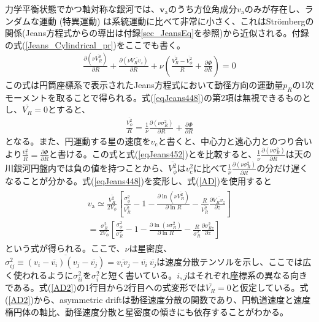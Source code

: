 力学平衡状態でかつ軸対称な銀河では、$\pmb{v}_{\mathrm{a}}$のうち方位角成分$v_{\mathrm{a}}$のみが存在し、ランダムな運動 (特異運動) は系統運動に比べて非常に小さく、これはStr\"{o}mbergの関係(Jeans方程式からの導出は付録\ref{sec_JeansEq}を参照)から近似される。付録の式(\ref{Jeans_Cylindrical_pr})をここでも書く。
\begin{align}
	\frac{\partial (\nu \overline{V_R^2})}{\partial R} + \frac{\partial (\nu \overline{V_R v_z})}{\partial R} + \nu\left(\frac{\overline{V_R^2} - \overline{V_{\phi}^2}}{R} + \frac{\partial \Phi}{\partial R} \right) = 0 \label{eqJeans448}
\end{align}
この式は円筒座標系で表示されたJeans方程式において動径方向の運動量$p_R$の1次モーメントを取ることで得られる。式(\ref{eqJeans448})の第2項は無視できるものとし、$\overline{V_R}=0$とすると、
\begin{align}
	\frac{\overline{V_{\phi}^2}}{R} = \frac{1}{\nu}\frac{\partial(\nu\sigma_R^2)}{\partial R} + \frac{\partial \Phi}{\partial R} \label{eqJeans452}
\end{align}
となる。また、円運動する星の速度を$v_{\mathrm{c}}$と書くと、中心力と遠心力とのつり合いより$\frac{v_{\mathrm{c}}^2}{R}=\frac{\partial \Phi}{\partial R}$と書ける。この式と式(\ref{eqJeans452})とを比較すると、$\frac{1}{\nu}\frac{\partial(\nu\sigma_R^2)}{\partial R}$は天の川銀河円盤内では負の値を持つことから、$\overline{V_{\phi}^2}$は$v_{\mathrm{c}}^2$に比べて$\frac{1}{\nu}\frac{\partial(\nu\sigma_R^2)}{\partial R}$の分だけ遅くなることが分かる。式(\ref{eqJeans448})を変形し、式(\ref{AD})を使用すると
\begin{align}
\begin{aligned}
    v_{\mathrm{a}} \simeq \frac{\overline{V_R^2}}{2V_{\phi}} \left[\frac{\sigma_{\phi}^2}{\overline{V_R^2}} - 1 - \frac{\partial \ln(\nu \overline{V_R^2})}{\partial \ln R} - \frac{R}{\overline{V_R^2}}\frac{\partial \overline{V_R v_z}}{\partial z}\right] \\
    = \frac{\sigma_R^2}{2V_{\phi}} \left[\frac{\sigma_{\phi}^2}{\sigma_R^2} - 1 - \frac{\partial \ln(\nu \sigma_R^2)}{\partial \ln R} - \frac{R}{\sigma_R^2}\frac{\partial \sigma_{Rz}^2}{\partial z}\right]
\end{aligned} \label{AD2}
\end{align}
という式が得られる。ここで、$\nu$は星密度、$\sigma_{ij}^2 \equiv \overline{(v_i-\overline{v_i})(v_j-\overline{v_j})}=\overline{v_i v_j}-\overline{v_i}\ \overline{v_j}$は速度分散テンソルを示し、ここでは広く使われるように$\sigma_{ii}^2$を$\sigma_i^2$と短く書いている。$i,j$はそれぞれ座標系の異なる向きである。式(\ref{AD2})の1行目から2行目への式変形では$\overline{V_R}=0$と仮定している。式(\ref{AD2})から、asymmetric driftは動径速度分散の関数であり、円軌道速度と速度楕円体の軸比、動径速度分散と星密度の傾きにも依存することがわかる。

